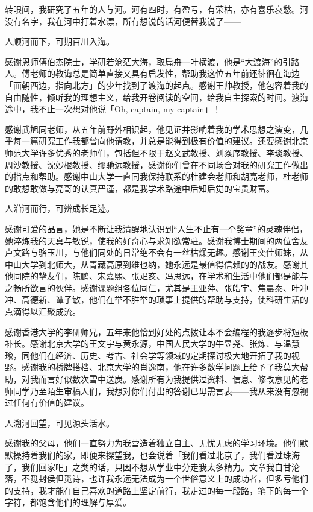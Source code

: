 

\begin{ack}

    转眼间，我研究了五年的人与河。河有四时，有盈亏，有荣枯，亦有喜乐哀愁。河没有名字，我在河中打着水漂，所有想说的话河便替我说了——

    人顺河而下，可期百川入海。
    
    感谢恩师傅伯杰院士，学研若沧茫大海，取扁舟一叶横渡，他是“大渡海”的引路人。傅老师的教诲总是简单直接又具有启发性，帮助我这位五年前还徘徊在海边「面朝西边，指向北方」的少年找到了渡海的起点。感谢王帅教授，他包容着我的自由随性，倾听我的理想主义，给我开卷阅读的空间，给我自主探索的时间。渡海途中，我不止一次想对他说「Oh, captain, my captain」！
    
    感谢武旭同老师，从五年前野外相识起，他见证并影响着我的学术思想之演变，几乎每一篇研究工作我都曾向他请教，并总是能得到极有价值的建议。还要感谢北京师范大学许多优秀的老师们，包括但不限于赵文武教授、刘焱序教授、李琰教授、周沙教授、沈妙根教授、缪驰远教授，感谢你们曾在不同场合对我的研究工作做出的指点和帮助。感谢中山大学一直同我保持联系的杜建会老师和胡亮老师，杜老师的敢想敢做与亮哥的认真严谨，都是我学术路途中后知后觉的宝贵财富。
    
    人沿河而行，可辨成长足迹。
    
    感谢可爱的品言，她是不断让我清醒地认识到“人生不止有一个奖章”的灵魂伴侣，她淬炼我的天真与敏锐，使我的好奇心与求知欲常驻。感谢我博士期间的两位舍友卢文路与骆玉川，与他们同处的日常绝不会有一丝枯燥无趣。感谢王奕佳师妹，从中山大学到北师大，从青藏高原到维也纳，她永远是最值得信赖的的战友。感谢其他同院的挚友们，陈鹏、宋嘉熙、张疋亥、冯思远，在学术和生活中他们都是能与之畅所欲言的伙伴。感谢课题组各位同仁，尤其是王亚萍、张皓宇、焦晨泰、叶冲冲、高德新、谭子敏，他们在举不胜举的琐事上提供的帮助与支持，使科研生活的点滴得以汇聚成流。
    
    感谢香港大学的李研师兄，五年来他恰到好处的点拨让本不会编程的我逐步将短板补长。感谢北京大学的王文宇与黄永源，中国人民大学的牛昱尧、张炼、与温慧瑜，同他们在经济、历史、考古、社会学等领域的定期探讨极大地开拓了我的视野。感谢我的桥牌搭档、北京大学的肖逸南，他在许多数学问题上给予了我莫大帮助，对我而言好似数次雪中送炭。感谢所有为我提供过资料、信息、修改意见的老师同学乃至陌生审稿人们，我想对你们付出的答谢已毋需言表——我从来没有忽视过任何有价值的建议。
    
    人溯河回望，可见源头活水。
    
    感谢我的父母，他们一直努力为我营造着独立自主、无忧无虑的学习环境。他们默默操持着我们的家，即便来探望我，也会说着「我们看过北京了，我们看过珠海了，我们回家吧」之类的话，只因不想从学业中分走我太多精力。文章我自甘沦落，不觅封侯但觅诗，也许我永远无法成为一个世俗意义上的成功者，但多亏他们的支持，我才能在自己喜欢的道路上坚定前行，我走过的每一段路，笔下的每一个字符，都饱含他们的理解与厚爱。
    

\end{ack}
